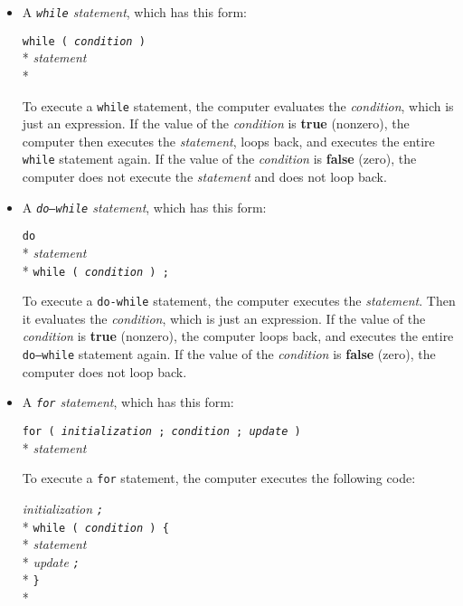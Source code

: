 \begin{itemize}
\item A {\em {\tt while} statement}\/, which has this form:

\begin{flushleft}
{\tt while ( {\em condition} )} \\*
{\hspace{8pt}\em statement} \\*
\end{flushleft}

To execute a {\tt while} statement, the computer evaluates the {\em
condition}\/, which is just an expression.  If the value of the {\em
condition} is {\bf true} (nonzero), the computer then executes the {\em
statement}, loops back, and executes the entire {\tt while} statement
again. If the value of the {\em condition}\/ is {\bf false} (zero), the
computer does not execute the {\em statement}\/ and does not loop back.

\item A {\em {\tt do{\rm--}while} statement}\/, which has this form:

\begin{flushleft}
{\tt do } \\*
{\hspace{8pt}\em statement} \\*
{\tt while ( {\em condition} ) ;}
\end{flushleft}

To execute a {\tt do{\rm-}while} statement, the computer executes the
{\em statement}\/. Then it evaluates the {\em condition}\/, which is
just an expression.  If the value of the {\em condition} is {\bf true}
(nonzero), the computer loops back, and executes the entire {\tt
do{\rm--}while} statement again. If the value of the {\em condition}\/
is {\bf false} (zero), the computer does not loop back.

\item A {\em {\tt for} statement}\/, which has this form:

\begin{flushleft}
{\tt for ( {\em initialization}\/ ; {\em condition} ; {\em update} ) } \\*
{\hspace{8pt}\em statement} 
\end{flushleft}

To execute a {\tt for} statement, the computer executes the following
code:

\begin{flushleft}
{ \em initialization \tt ;} \\*
{\tt while ( {\em condition} ) \{ } \\*
{\hspace{8pt}\em statement} \\*
{\hspace{8pt}\em update \tt ;} \\*
{\tt\}} \\*
\end{flushleft}


\end{itemize}

